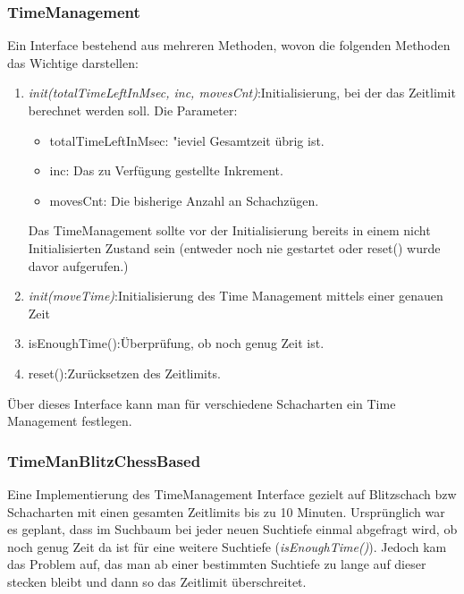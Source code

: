 \subsubsection {TimeManagement}
Ein Interface bestehend aus mehreren Methoden, wovon die folgenden Methoden das Wichtige darstellen:
\begin{enumerate}
    \item{ \textit{init(totalTimeLeftInMsec, inc, movesCnt)}:\newline Initialisierung, bei der das Zeitlimit berechnet werden soll. \newline Die Parameter:
            \begin{itemize}
                \item{totalTimeLeftInMsec: "ieviel Gesamtzeit übrig ist.}
                \item{inc: Das zu Verfügung gestellte Inkrement.}
                \item{movesCnt: Die bisherige Anzahl an Schachzügen.}
            \end{itemize}
         Das TimeManagement sollte vor der Initialisierung bereits in einem nicht Initialisierten Zustand sein (entweder noch nie gestartet oder reset() wurde davor aufgerufen.)}
     \item{ \textit{init(moveTime)}:\newline Initialisierung des Time Management mittels einer genauen Zeit}
    \item{ isEnoughTime():\newline Überprüfung, ob noch genug Zeit ist.}
    \item{ reset():\newline Zurücksetzen des Zeitlimits.}
\end{enumerate}
Über dieses Interface kann man für verschiedene Schacharten ein Time Management festlegen.\newline

\subsubsection{TimeManBlitzChessBased}
Eine Implementierung des TimeManagement Interface gezielt auf Blitzschach bzw Schacharten mit einen gesamten Zeitlimits bis zu 10 Minuten. \newline
Urspr\"unglich war es geplant, dass im Suchbaum bei jeder neuen Suchtiefe einmal abgefragt wird, ob noch genug Zeit da ist für eine weitere Suchtiefe (\textit{isEnoughTime()}). Jedoch kam das Problem auf, das man ab einer bestimmten Suchtiefe zu lange auf dieser stecken bleibt und dann so das Zeitlimit überschreitet. 

